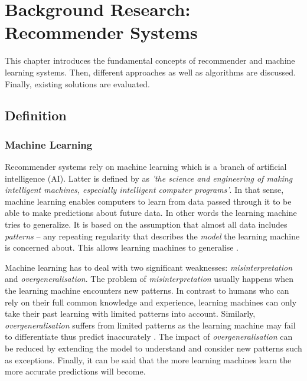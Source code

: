 \chapter{Background Research: Recommender Systems}

This chapter introduces the fundamental concepts of recommender and machine learning systems. Then, different approaches as well as algorithms are discussed. Finally, existing solutions are evaluated.

\section{Definition}



\subsection{Machine Learning}

Recommender systems rely on machine learning which is a branch of artificial intelligence (AI). Latter is defined by  as \textit{'the science and engineering of making intelligent machines, especially intelligent computer programs'}. In that sense, machine learning enables computers to learn from data passed through it to be able to make predictions about future data. In other words the learning machine tries to generalize. It is based on the assumption that almost all data includes \textit{patterns} -- any repeating regularity that describes the \textit{model} the learning machine is concerned about. This allows learning machines to generalise \cite{segaran07}.

Machine learning has to deal with two significant weaknesses: \textit{misinterpretation} and \textit{overgeneralisation}. The problem of \textit{misinterpretation} usually happens when the learning machine encounters new patterns. In contrast to humans who can rely on their full common knowledge and experience, learning machines can only take their past learning with limited patterns into account. Similarly, \textit{overgeneralisation} suffers from limited patterns as the learning machine may fail to differentiate thus predict inaccurately \cite{segaran07}. The impact of \textit{overgeneralisation} can be reduced by extending the model to understand and consider new patterns such as exceptions. Finally, it can be said that the more learning machines learn the more accurate predictions will become.

